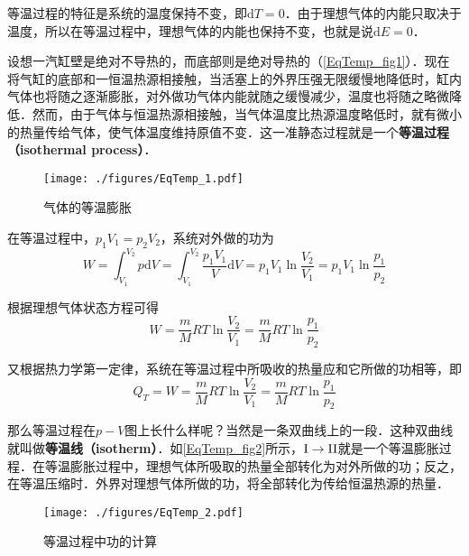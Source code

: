 

等温过程的特征是系统的温度保持不变，即$\mathrm dT=0$．由于理想气体的内能只取决于温度，所以在等温过程中，理想气体的内能也保持不变，也就是说$\mathrm dE=0$．

设想一汽缸壁是绝对不导热的，而底部则是绝对导热的（\autoref{EqTemp_fig1}）．现在将气缸的底部和一恒温热源相接触，当活塞上的外界压强无限缓慢地降低时，缸内气体也将随之逐渐膨胀，对外做功气体内能就随之缓慢减少，温度也将随之略微降低．然而，由于气体与恒温热源相接触，当气体温度比热源温度略低时，就有微小的热量传给气体，使气体温度维持原值不变．这一准静态过程就是一个\textbf{等温过程（isothermal process）}．
\begin{figure}[ht]
\centering
\texttt{[image: ./figures/EqTemp\_1.pdf]}
\caption{气体的等温膨胀} \label{EqTemp_fig1}
\end{figure}

在等温过程中，$p_1V_1=p_2V_2$，系统对外做的功为
\begin{equation}
W= \int_{V_{1}}^{V_{2}} p \mathrm{d} V=\int_{V_{1}}^{V_{2}} \frac{p_{1} V_{1}}{V} \mathrm{d} V=p_{1} V_{1} \ln \frac{V_{2}}{V_{1}}=p_{1} V_{1} \ln \frac{p_{1}}{p_{2}}
\end{equation}

根据理想气体状态方程可得
\begin{equation}
W=\frac{m}{M} R T \ln \frac{V_{2}}{V_{1}}=\frac{m}{M} R T \ln \frac{p_{1}}{p_{2}}
\end{equation}

又根据热力学第一定律，系统在等温过程中所吸收的热量应和它所做的功相等，即
\begin{equation}
Q_{T}=W=\frac{m}{M} R T \ln \frac{V_{2}}{V_{1}}=\frac{m}{M} R T \ln \frac{p_{1}}{p_{2}}
\end{equation}

那么等温过程在$p-V$图上长什么样呢？当然是一条双曲线上的一段．这种双曲线就叫做\textbf{等温线（isotherm）}．如\autoref{EqTemp_fig2}所示，$\rm I\to II$就是一个等温膨胀过程．在等温膨胀过程中，理想气体所吸取的热量全部转化为对外所做的功；反之，在等温压缩时．外界对理想气体所做的功，将全部转化为传给恒温热源的热量．

\begin{figure}[ht]
\centering
\texttt{[image: ./figures/EqTemp\_2.pdf]}
\caption{等温过程中功的计算} \label{EqTemp_fig2}
\end{figure}

